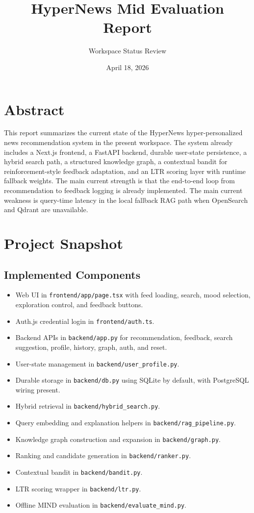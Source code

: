 \documentclass[12pt]{article}
\title{HyperNews Mid Evaluation Report}
\author{Workspace Status Review}
\date{April 18, 2026}
\begin{document}
\maketitle

\section{Abstract}
This report summarizes the current state of the HyperNews hyper-personalized news recommendation system in the present workspace. The system already includes a Next.js frontend, a FastAPI backend, durable user-state persistence, a hybrid search path, a structured knowledge graph, a contextual bandit for reinforcement-style feedback adaptation, and an LTR scoring layer with runtime fallback weights. The main current strength is that the end-to-end loop from recommendation to feedback logging is already implemented. The main current weakness is query-time latency in the local fallback RAG path when OpenSearch and Qdrant are unavailable.

\section{Project Snapshot}
\subsection{Implemented Components}
\begin{itemize}[leftmargin=1.5em]
  \item Web UI in \texttt{frontend/app/page.tsx} with feed loading, search, mood selection, exploration control, and feedback buttons.
  \item Auth.js credential login in \texttt{frontend/auth.ts}.
  \item Backend APIs in \texttt{backend/app.py} for recommendation, feedback, search suggestion, profile, history, graph, auth, and reset.
  \item User-state management in \texttt{backend/user_profile.py}.
  \item Durable storage in \texttt{backend/db.py} using SQLite by default, with PostgreSQL wiring present.
  \item Hybrid retrieval in \texttt{backend/hybrid_search.py}.
  \item Query embedding and explanation helpers in \texttt{backend/rag_pipeline.py}.
  \item Knowledge graph construction and expansion in \texttt{backend/graph.py}.
  \item Ranking and candidate generation in \texttt{backend/ranker.py}.
  \item Contextual bandit in \texttt{backend/bandit.py}.
  \item LTR scoring wrapper in \texttt{backend/ltr.py}.
  \item Offline MIND evaluation in \texttt{backend/evaluate_mind.py}.
\end{itemize}
\end{document}
